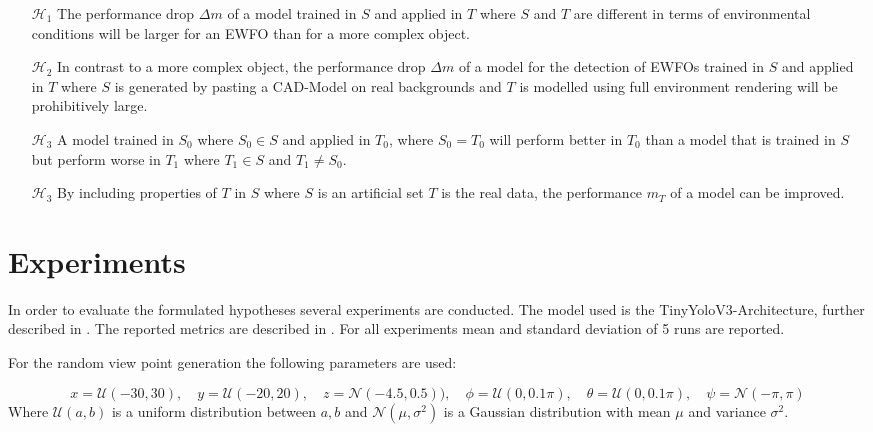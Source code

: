 \begin{enumerate}
	\item[$\mathcal{H}_1$] The performance drop $\Delta m$ of a model trained in $S$ and applied in $T$ where $S$ and $T$ are different in terms of environmental conditions will be larger for an \ac{EWFO} than for a more complex object.
	
	\item[$\mathcal{H}_2$] In contrast to a more complex object, the performance drop $\Delta m$ of a model for the detection of \acp{EWFO} trained in $S$ and applied in $T$ where $S$ is generated by pasting a \ac{CAD}-Model on real backgrounds and $T$ is modelled using full environment rendering will be prohibitively large.
	
	\item[$\mathcal{H}_3$] A model trained in $S_0$ where $S_0 \in S$ and applied in $T_0$, where $S_0 = T_0$ will perform better in $T_0$ than a model that is trained in $S$ but perform worse in $T_1$ where $T_1 \in S$ and $T_1 \neq S_0$. 

	\item[$\mathcal{H}_3$] By including properties of $T$ in $S$ where $S$ is an artificial set $T$ is the real data, the performance $m_T$ of a model can be improved. 

\end{enumerate}

\section{Experiments}
\label{sec:training:experiments}
In order to evaluate the formulated hypotheses several experiments are conducted. The model used is the TinyYoloV3-Architecture, further described in . The reported metrics are described in . For all experiments mean and standard deviation of 5 runs are reported.

For the random view point generation the following parameters are used:

\begin{equation}
	x = \mathcal{U}(-30,30),\quad y = \mathcal{U}(-20,20),\quad z = \mathcal{N}(-4.5,0.5)),\quad
	\phi = \mathcal{U}(0,0.1\pi),\quad \theta = \mathcal{U}(0,0.1\pi),\quad \psi = \mathcal{N}(-\pi,\pi)
	\label{eq:distroexp}
\end{equation}
Where $ \mathcal{U}(a,b)$ is a uniform distribution between $a,b$ and $\mathcal{N}(\mu,\sigma^2)$ is a Gaussian distribution with mean $\mu$ and variance $\sigma^2$.

